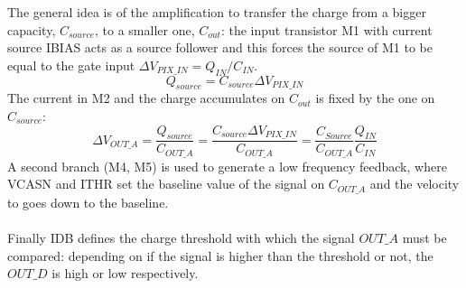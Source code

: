         The general idea is of the amplification to transfer the charge from a bigger capacity\cite{ALPIDE-FE}, $C_{source}$, to a smaller one, $C_{out}$: the input transistor M1 with current source IBIAS acts as a source follower and this forces the source of M1 to be equal to the gate input  $\Delta V_{PIX\_IN} = Q_{IN}/C_{IN}$.
        \begin{equation}
            Q_{source} = C_{source} \Delta V_{PIX\_IN}
        \end{equation}
        The current in M2 and the charge accumulates on $C_{out}$ is fixed by the one on $C_{source}$:
        \begin{equation}
            \Delta V_{OUT\_A} = \frac{Q_{source}}{C_{OUT\_A}} = \frac{C_{source}\Delta V_{PIX\_IN}}{C_{OUT\_A}}  = \frac{C_{Source}}{C_{OUT\_A}}\frac{Q_{IN}}{C_{IN}}
        \end{equation}
        A second branch (M4, M5) is used to generate a low frequency feedback, where VCASN and ITHR set the baseline value of the signal on $C_{OUT\_A}$ and the velocity to goes down to the baseline.\\
        \\
        Finally IDB defines the charge threshold with which the signal $OUT\_A$ must be compared: depending on if the signal is higher than the threshold or not, the $OUT\_D$ is high or low respectively.

